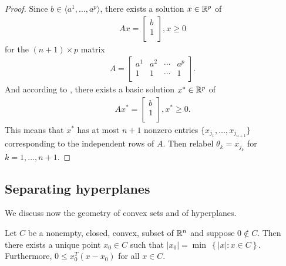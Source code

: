 \begin{proof}
Since $b \in \langle a^1, \dots, a^p \rangle$, there exists a solution $x \in \mathbb{R}^p$ of 
\begin{align}
A x = \begin{bmatrix}
b \\
1 \\
\end{bmatrix},
x \ge 0
\end{align}
for the $(n+1) \times p$ matrix 
\begin{align}
A = \begin{bmatrix}
a^1 & a^2 & \cdots & a^p \\
1   & 1   & \cdots & 1   \\
\end{bmatrix}.
\end{align}
And according to , there exists a basic solution $x^* \in \mathbb{R}^p$ of 
\begin{align}
A x^* = \begin{bmatrix}
b \\
1 \\
\end{bmatrix},
x^* \ge 0.
\end{align}
This means that $x^*$ has at most $n+1$ nonzero entries $\{ x_{j_1}, \dots, x_{j_{n+1}} \}$ corresponding to the independent rows of $A$.
Then relabel $\theta_k = x_{j_k}$ for $k = 1, \dots, n+1$.
\end{proof}

\subsection{Separating hyperplanes}

We discuss now the geometry of convex sets and of hyperplanes. 

\begin{lemma}
Let $C$ be a nonempty, closed, convex, subset of $\mathbb{R}^n$ and suppose $0 \notin C$. 
Then there exists a unique point $x_0 \in C$ such that $|x_0| = \min \ \left\{ |x| : x \in C \right\}$.
Furthermore, $0 \le x_0 ^T (x-x_0)$ for all $x \in C$.
\end{lemma}

